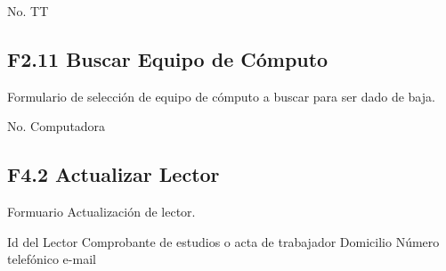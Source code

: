 \begin{UClist}
	\UCli No. TT
\end{UClist}

\subsection{F2.11 Buscar Equipo de Cómputo}
Formulario de selección de equipo de cómputo a buscar para ser dado de baja.\\

\begin{UClist}
	\UCli No. Computadora
\end{UClist}







\subsection{F4.2 Actualizar Lector }
  Formuario Actualización de lector.\\

	\begin{UClist}
      \UCli Id del Lector
      \UCli Comprobante de estudios o acta de trabajador
      \UCli Domicilio
      \UCli Número telefónico
      \UCli e-mail
    \end{UClist}





